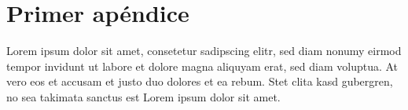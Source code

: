 
\chapter{Primer apéndice}

Lorem ipsum dolor sit amet, consetetur sadipscing elitr, sed diam nonumy eirmod
tempor invidunt ut labore et dolore magna aliquyam erat, sed diam voluptua. At
vero eos et accusam et justo duo dolores et ea rebum. Stet clita kasd gubergren,
no sea takimata sanctus est Lorem ipsum dolor sit amet.

\endinput

